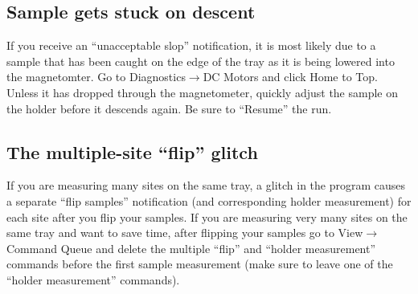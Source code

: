 \documentclass[11pt,letterpaper]{article}
\begin{document}
\subsection*{Sample gets stuck on descent}
If you receive an ``unacceptable slop'' notification, it is most likely due to a sample that has been caught on the edge of the tray as it is being lowered into the magnetomter. Go to \textsf{Diagnostics}$\rightarrow$\textsf{DC Motors} and click \textsf{Home to Top}. Unless it has dropped through the magnetometer, quickly adjust the sample on the holder before it descends again. Be sure to ``Resume'' the run.

\subsection*{The multiple-site ``flip'' glitch}
If you are measuring many sites on the same tray, a glitch in the program causes a separate ``flip samples'' notification (and corresponding holder measurement) for each site after you flip your samples. If you are measuring very many sites on the same tray and want to save time, after flipping your samples go to \textsf{View}$\rightarrow$\textsf{Command Queue} and delete the multiple ``flip'' and ``holder measurement'' commands before the first sample measurement (make sure to leave one of the ``holder measurement'' commands).
\end{document}

